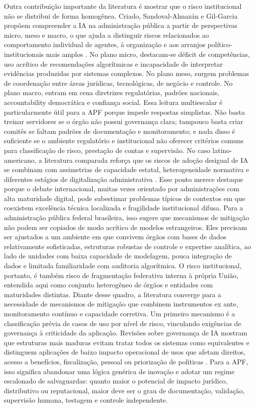 \documentclass[12pt,a4paper]{article}
\begin{document}
Outra contribuição importante da literatura é mostrar que o risco institucional não se distribui de forma homogênea. Criado, Sandoval-Almazán e Gil-Garcia propõem compreender a IA na administração pública a partir de perspectivas micro, meso e macro, o que ajuda a distinguir riscos relacionados ao comportamento individual de agentes, à organização e aos arranjos político-institucionais mais amplos \autocite{criado2024artificial}. No plano micro, destacam-se déficit de competências, uso acrítico de recomendações algorítmicas e incapacidade de interpretar evidências produzidas por sistemas complexos. No plano meso, surgem problemas de coordenação entre áreas jurídicas, tecnológicas, de negócio e controle. No plano macro, entram em cena diretrizes regulatórias, padrões nacionais, accountability democrática e confiança social. Essa leitura multiescalar é particularmente útil para a APF porque impede respostas simplistas. Não basta treinar servidores se o órgão não possui governança clara; tampouco basta criar comitês se faltam padrões de documentação e monitoramento; e nada disso é suficiente se o ambiente regulatório e institucional não oferecer critérios comuns para classificação de risco, prestação de contas e supervisão.
No caso latino-americano, a literatura comparada reforça que os riscos de adoção desigual de IA se combinam com assimetrias de capacidade estatal, heterogeneidade normativa e diferentes estágios de digitalização administrativa \autocite{criado2024inteligencia}. Esse ponto merece destaque porque o debate internacional, muitas vezes orientado por administrações com alta maturidade digital, pode subestimar problemas típicos de contextos em que coexistem excelência técnica localizada e fragilidade institucional difusa. Para a administração pública federal brasileira, isso sugere que mecanismos de mitigação não podem ser copiados de modo acrítico de modelos estrangeiros. Eles precisam ser ajustados a um ambiente em que convivem órgãos com bases de dados relativamente sofisticadas, estruturas robustas de controle e expertise analítica, ao lado de unidades com baixa capacidade de modelagem, pouca integração de dados e limitada familiaridade com auditoria algorítmica. O risco institucional, portanto, é também risco de fragmentação federativa interna à própria União, entendida aqui como conjunto heterogêneo de órgãos e entidades com maturidades distintas.
Diante desse quadro, a literatura converge para a necessidade de mecanismos de mitigação que combinem instrumentos ex ante, monitoramento contínuo e capacidade corretiva. Um primeiro mecanismo é a classificação prévia de casos de uso por nível de risco, vinculando exigências de governança à criticidade da aplicação. Revisões sobre governança de IA mostram que estruturas mais maduras evitam tratar todos os sistemas como equivalentes e distinguem aplicações de baixo impacto operacional de usos que afetam direitos, acesso a benefícios, fiscalização, pessoal ou priorização de políticas \autocite{batool2025ai} \autocite{sigfrids2022how}. Para a APF, isso significa abandonar uma lógica genérica de inovação e adotar um regime escalonado de salvaguardas: quanto maior o potencial de impacto jurídico, distributivo ou reputacional, maior deve ser o grau de documentação, validação, supervisão humana, testagem e controle independente.
\end{document}
